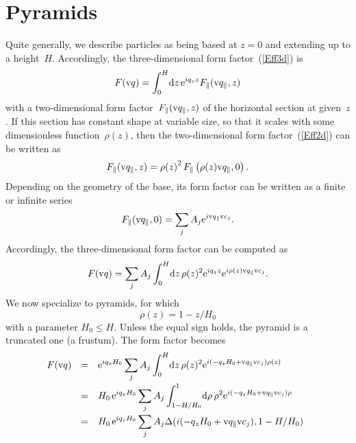 \section{Pyramids}

%
%
%
%

Quite generally, we describe particles
as being based at $z=0$ and extending up to a height~$H$.
Accordingly,
the three-dimensional form factor~(\ref{Eff3d}) is
\begin{equation}
  F(\text{v}{q}) = \int_0^H\!\text{d} z\,\text{e}^{iq_z z} F_\parallel(\text{v}{q}_\parallel,z)
\end{equation}
with a two-dimensional form factor~$F_\parallel(\text{v}{q}_\parallel,z)$
of the horizontal section at given~$z$.
If this section has constant shape at variable size,
so that it scales with some dimensionless function~$\rho(z)$,
then the two-dimensional form factor~(\ref{Eff2d})
can be written as
\begin{equation}
  F_\parallel(\text{v}{q}_\parallel,z)
  = {\rho(z)}^2\, F_\parallel\left(\rho(z)\text{v}{q}_\parallel,0\right).
\end{equation}
Depending on the geometry of the base,
its form factor can be written as a finite or infinite series
\begin{equation}
  F_\parallel(\text{v}{q}_\parallel,0)=\sum_j A_j \text{e}^{i\text{v}{q}_\parallel \text{v}{c}_j}.
\end{equation}
Accordingly, the three-dimensional form factor can be computed as
\begin{equation}
  F(\text{v}{q}) = \sum_j A_j \int_0^H\!\text{d} z\,\rho(z)^2\text{e}^{iq_z z} \text{e}^{i\rho(z)\text{v}{q}_\parallel \text{v}{c}_j}.
\end{equation}
We now specialize to pyramids,
for which
\begin{equation}
  \rho(z) = 1-z/H_0
\end{equation}
with a parameter $H_0\le H$.
Unless the equal sign holds,
the pyramid is a truncated one (a frustum).
The form factor becomes
\begin{equation}
  \begin{array}{@{}lcl}
  F(\q)
  &=& \displaystyle
       \e^{iq_z H_0} \sum_j A_j \int_0^H\!\d z\,\rho(z)^2\e^{i(-q_zH_0 +\q_\parallel \v{c}_j)\rho(z)}
\\[3ex]
  &=& \displaystyle
       H_0\, \e^{iq_z H_0} \sum_j A_j \int_{1-H/H_0}^1\!\d\rho\, \rho^2\e^{i(-q_zH_0 +\q_\parallel \v{c}_j)\rho}
\\[3ex]
  &=& \displaystyle
       H_0\, \e^{iq_z H_0} \sum_j A_j \Delta(i(-q_zH_0 +\q_\parallel \v{c}_j),1-H/H_0)
  \end{array}
\end{equation}
